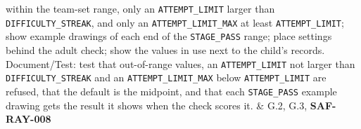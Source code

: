 \documentclass{article}
\newenvironment{fmealandscape}{
    \begin{landscape}
    \pagestyle{empty}
    \AddToShipoutPictureFG{ \AtPageLowerLeft{
        \put(\LenToUnit{\dimexpr\paperwidth-1.5cm\relax},
        \LenToUnit{.5\paperheight}){ \makebox(0,0)[c]{\rotatebox{90}{\thepage}}
        } } } }{
    \end{landscape}
    \ClearShipoutPictureFG }
\begin{document}
\begin{fmealandscape}
{\begin{longtable}
within the team-set range, only an \texttt{ATTEMPT\_LIMIT} larger than
\texttt{DIFFICULTY\_STREAK}, and only an \texttt{ATTEMPT\_LIMIT\_MAX} at least
\texttt{ATTEMPT\_LIMIT}; show example drawings of each end of the
\texttt{STAGE\_PASS} range; place settings behind the adult check; show the
values in use next to the child's records. Document/Test: test that out-of-range
values, an \texttt{ATTEMPT\_LIMIT} not larger than \texttt{DIFFICULTY\_STREAK}
and an \texttt{ATTEMPT\_LIMIT\_MAX} below \texttt{ATTEMPT\_LIMIT} are refused,
that the default is the midpoint, and that each \texttt{STAGE\_PASS} example
drawing gets the result it shows when the check scores it. & G.2, G.3,
\textbf{SAF-RAY-008} \\
\end{longtable}
}
\end{fmealandscape}
\end{document}
